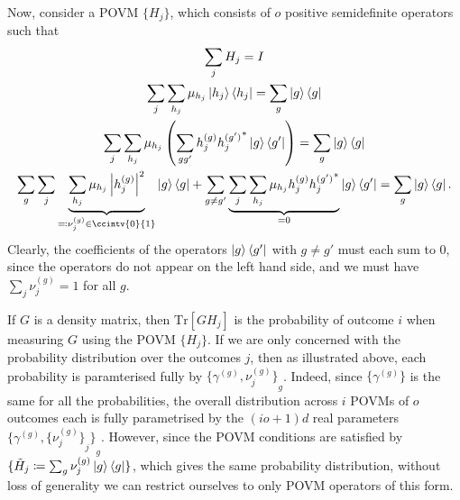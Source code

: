 \documentclass[10pt, a4paper]{article}
\numberwithin{equation}{section} %
\theoremstyle{definition}
\theoremstyle{plain}
\newcommand{\abs}[1]{\left\lvert#1\right\rvert}
\newcommand{\?}{\mathrel{?}} %
\newcommand{\Tr}{\mathrm{Tr}} %
\begin{document}
    Now, consider a POVM \(\{H_j\}\), which consists of \(o\) positive semidefinite operators such that
    \begin{gather*}
      \sum_j H_j = I \\
      \sum_j \sum_{h_j} \mu_{h_j} \ket{h_j}\bra{h_j} = \sum_g \ket{g}\bra{g} \\
      \sum_j \sum_{h_j} \mu_{h_j} \left(\sum_{gg'} h_j^{(g)} {h_j^{(g')}}^* \ket{g}\bra{g'}\right) = \sum_g \ket{g}\bra{g} \\
      \sum_{g} \sum_j \underbrace{\sum_{h_j} \mu_{h_j} \abs{h_j^{(g)}}^2}_{\eqqcolon \nu^{(g)}_j \in \ccintv{0}{1}} \ket{g}\bra{g} + \sum_{g \neq g'} \underbrace{ \sum_j \sum_{h_j} \mu_{h_j} h_j^{(g)} {h_j^{(g')}}^* }_{=0} \ket{g}\bra{g'} = \sum_g \ket{g}\bra{g}.
    \end{gather*}
    Clearly, the coefficients of the operators \(\ket{g}\bra{g'}\) with \(g \neq g'\) must each sum to 0, since the operators do not appear on the left hand side, and we must have \(\sum_j \nu^{(g)}_j = 1\) for all \(g\).

    If \(G\) is a density matrix, then \(\Tr[GH_j]\) is the probability of outcome \(i\) when measuring \(G\) using the POVM \(\{H_j\}\). If we are only concerned with the probability distribution over the outcomes \(j\), then as illustrated above, each probability is paramterised fully by \({\{\gamma^{(g)}, \nu^{(g)}_j\}}_{g}\). Indeed, since \(\{\gamma^{(g)}\}\) is the same for all the probabilities, the overall distribution across \(i\) POVMs of \(o\) outcomes each is fully parametrised by the \((io+1)d\) real parameters \({\{\gamma^{(g)}, {\{\nu^{(g)}_j\}}_j \}}_{g}\). However, since the POVM conditions are satisfied by \(\{\tilde{H}_j \coloneqq \sum_g \nu^{(g)}_j \ket{g}\bra{g}\}\), which gives the same probability distribution, without loss of generality we can restrict ourselves to only POVM operators of this form.
\end{document}
